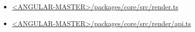

\begin{itemize}
  \item \href{https://github.com/angular/angular/blob/master/packages/core/src/render.ts}
        {<ANGULAR-MASTER>/packages/core/src/render.ts}
\end{itemize}






\begin{itemize}
  \item \href{https://github.com/angular/angular/blob/master/packages/core/src/render/api.ts}
        {<ANGULAR-MASTER>/packages/core/src/render/api.ts}
\end{itemize}






